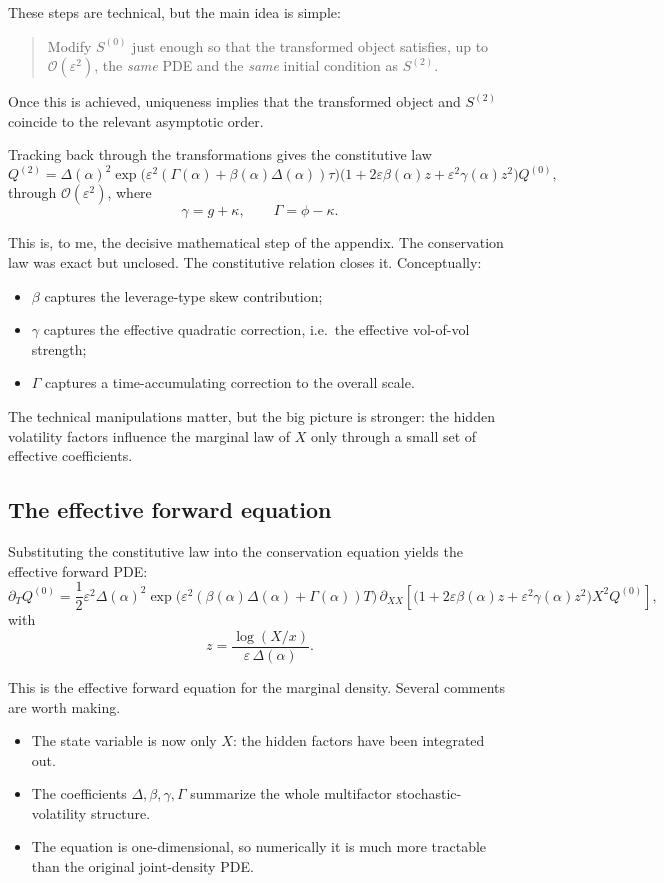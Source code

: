 \documentclass[11pt]{article}
\newcommand{\eps}{\varepsilon}
\newcommand{\Order}[1]{\mathcal{O}\!\left(#1\right)}
\begin{document}
These steps are technical, but the main idea is simple:
\begin{quote}
Modify \(S^{(0)}\) just enough so that the transformed object satisfies, up to \(\Order{\eps^2}\), the \emph{same} PDE and the \emph{same} initial condition as \(S^{(2)}\).
\end{quote}

Once this is achieved, uniqueness implies that the transformed object and \(S^{(2)}\) coincide to the relevant asymptotic order.

Tracking back through the transformations gives the constitutive law
\[
Q^{(2)}
=
\Delta(\alpha)^2
\exp\!\bigl(\eps^2(\Gamma(\alpha)+\beta(\alpha)\Delta(\alpha))\tau\bigr)
\bigl(1+2\eps\beta(\alpha) z+\eps^2\gamma(\alpha) z^2\bigr)
Q^{(0)},
\]
through \(\Order{\eps^2}\), where
\[
\gamma = g+\kappa,
\qquad
\Gamma = \phi-\kappa.
\]

This is, to me, the decisive mathematical step of the appendix. The conservation law was exact but unclosed. The constitutive relation closes it. Conceptually:
\begin{itemize}
    \item \(\beta\) captures the leverage-type skew contribution;
    \item \(\gamma\) captures the effective quadratic correction, i.e.\ the effective vol-of-vol strength;
    \item \(\Gamma\) captures a time-accumulating correction to the overall scale.
\end{itemize}

The technical manipulations matter, but the big picture is stronger: the hidden volatility factors influence the marginal law of \(X\) only through a small set of effective coefficients.

\subsection{The effective forward equation}

Substituting the constitutive law into the conservation equation yields the effective forward PDE:
\[
\partial_T Q^{(0)}
=
\frac12 \eps^2 \Delta(\alpha)^2
\exp\!\bigl(\eps^2(\beta(\alpha)\Delta(\alpha)+\Gamma(\alpha))T\bigr)
\,
\partial_{XX}
\left[
\bigl(1+2\eps\beta(\alpha) z+\eps^2\gamma(\alpha) z^2\bigr)
X^2 Q^{(0)}
\right],
\]
with
\[
z=\frac{\log(X/x)}{\eps\,\Delta(\alpha)}.
\]

This is the effective forward equation for the marginal density. Several comments are worth making.
\begin{itemize}
    \item The state variable is now only \(X\): the hidden factors have been integrated out.
    \item The coefficients \(\Delta,\beta,\gamma,\Gamma\) summarize the whole multifactor stochastic-volatility structure.
    \item The equation is one-dimensional, so numerically it is much more tractable than the original joint-density PDE.
\end{itemize}
\end{document}
